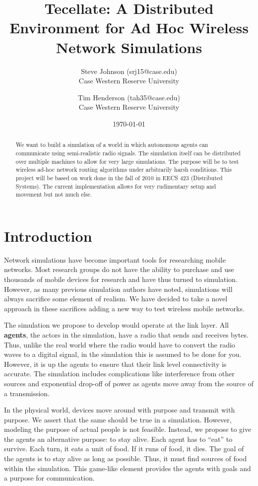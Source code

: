 \documentclass[12pt]{article}
\title{Tecellate: A Distributed Environment for Ad Hoc Wireless Network Simulations}
\author{
        Steve Johnson (srj15@case.edu)\\
        Case Western Reserve University\\
        \and Tim Henderson (tah35@case.edu)\\
        Case Western Reserve University
}
\date{\today}
\begin{document}
\doublespacing
\maketitle


\begin{abstract}
    We want to build a simulation of a world in which autonomous agents can communicate using semi-realistic radio signals. The simulation itself can be distributed over multiple machines to allow for very large simulations. The purpose will be to test wireless ad-hoc network routing algorithms under arbitrarily harsh conditions.
    This project will be based on work done in the fall of 2010 in EECS 423 (Distributed Systems). The current implementation allows for very rudimentary setup and movement but not much else.
\end{abstract}

\section{Introduction}

Network simulations have become important tools for researching mobile networks. Most research groups do not have the ability to purchase and use thousands of mobile devices for research and have thus turned to simulation. However, as many previous simulation authors have noted, simulations will always sacrifice some element of realism. We have decided to take a novel approach in these sacrifices adding a new way to test wireless mobile networks.

The simulation we propose to develop would operate at the link layer. All \textbf{agents}, the actors in the simulation, have a radio that sends and receives bytes. Thus, unlike the real world where the radio would have to convert the radio waves to a digital signal, in the simulation this is assumed to be done for you. However, it is up the agents to ensure that their link level connectivity is accurate. The simulation includes complications like interference from other sources and exponential drop-off of power as agents move away from the source of a transmission.

In the physical world, devices move around with purpose and transmit with purpose. We assert that the same should be true in a simulation. However, modeling the purpose of actual people is not feasible. Instead, we propose to give the agents an alternative purpose: to stay alive. Each agent has to ``eat'' to survive. Each turn, it eats a unit of food. If it runs of food, it dies. The goal of the agents is to stay alive as long as possible. Thus, it must find sources of food within the simulation. This game-like element provides the agents with goals and a purpose for communication.
\end{document}

